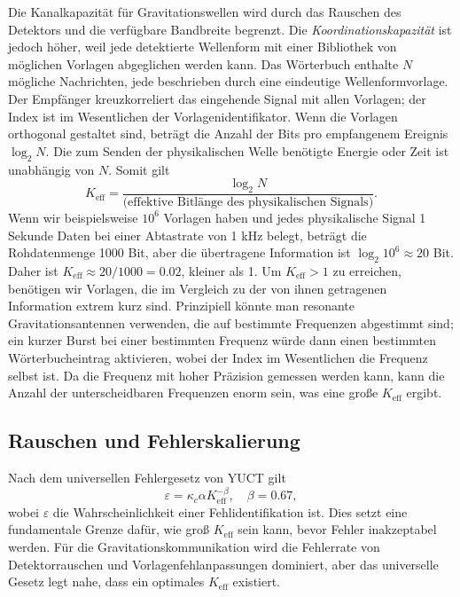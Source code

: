 \documentclass[12pt,a4paper]{article}
\newcommand{\Keff}{K_{\mathrm{eff}}}
\newcommand{\kappac}{\kappa_c}
\newcommand{\eps}{\varepsilon}
\begin{document}
	Die Kanalkapazität für Gravitationswellen wird durch das Rauschen des Detektors und die verfügbare Bandbreite begrenzt. Die \emph{Koordinationskapazität} ist jedoch höher, weil jede detektierte Wellenform mit einer Bibliothek von möglichen Vorlagen abgeglichen werden kann. Das Wörterbuch enthalte \(N\) mögliche Nachrichten, jede beschrieben durch eine eindeutige Wellenformvorlage. Der Empfänger kreuzkorreliert das eingehende Signal mit allen Vorlagen; der Index ist im Wesentlichen der Vorlagenidentifikator. Wenn die Vorlagen orthogonal gestaltet sind, beträgt die Anzahl der Bits pro empfangenem Ereignis \(\log_2 N\). Die zum Senden der physikalischen Welle benötigte Energie oder Zeit ist unabhängig von \(N\). Somit gilt
	\begin{equation}
		\Keff = \frac{\log_2 N}{\text{(effektive Bitlänge des physikalischen Signals)}}.
	\end{equation}
	Wenn wir beispielsweise \(10^6\) Vorlagen haben und jedes physikalische Signal 1 Sekunde Daten bei einer Abtastrate von 1 kHz belegt, beträgt die Rohdatenmenge 1000 Bit, aber die übertragene Information ist \(\log_2 10^6 \approx 20\) Bit. Daher ist \(\Keff \approx 20/1000 = 0.02\), kleiner als 1. Um \(\Keff > 1\) zu erreichen, benötigen wir Vorlagen, die im Vergleich zu der von ihnen getragenen Information extrem kurz sind. Prinzipiell könnte man resonante Gravitationsantennen verwenden, die auf bestimmte Frequenzen abgestimmt sind; ein kurzer Burst bei einer bestimmten Frequenz würde dann einen bestimmten Wörterbucheintrag aktivieren, wobei der Index im Wesentlichen die Frequenz selbst ist. Da die Frequenz mit hoher Präzision gemessen werden kann, kann die Anzahl der unterscheidbaren Frequenzen enorm sein, was eine große \(\Keff\) ergibt.
	
	\subsection{Rauschen und Fehlerskalierung}
	
	Nach dem universellen Fehlergesetz von YUCT \cite{AppendixL} gilt
	\begin{equation}
		\eps = \kappac \alpha \Keff^{-\beta}, \quad \beta = 0.67,
		\label{eq:universal-scaling}
	\end{equation}
	wobei \(\eps\) die Wahrscheinlichkeit einer Fehlidentifikation ist. Dies setzt eine fundamentale Grenze dafür, wie groß \(\Keff\) sein kann, bevor Fehler inakzeptabel werden. Für die Gravitationskommunikation wird die Fehlerrate von Detektorrauschen und Vorlagenfehlanpassungen dominiert, aber das universelle Gesetz legt nahe, dass ein optimales \(\Keff\) existiert.
	
\end{document}
